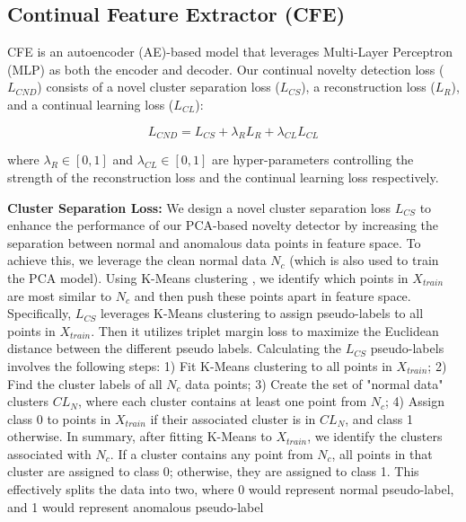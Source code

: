 \subsection{Continual Feature Extractor (CFE)}
CFE is an autoencoder (AE)-based model that leverages Multi-Layer Perceptron (MLP) as both the encoder and decoder. %
Our continual novelty detection loss ($L_{CND}$) consists of a novel cluster separation loss ($L_{CS}$), a reconstruction loss ($L_{R}$), and a continual learning loss ($L_{CL}$): 

\begin{equation}
    \label{equation:final_loss}
    L_{CND} = L_{CS} + \lambda_R L_R + \lambda_{CL} L_{CL}
\end{equation}

where $\lambda_R \in [0,1]$ and $\lambda_{CL} \in [0,1]$ are hyper-parameters controlling the strength of the reconstruction loss and the continual learning loss respectively. 

\textbf{Cluster Separation Loss:} We design a novel cluster separation loss $L_{CS}$ to enhance the performance of our PCA-based novelty detector by increasing the separation between normal and anomalous data points in feature space. To achieve this, we leverage the clean normal data $N_c$ (which is also used to train the PCA model). Using K-Means clustering \cite{kmeans2022}, we identify which points in $X_{train}$ are most similar to $N_c$ and then push these points apart in feature space. 
Specifically, $L_{CS}$ leverages K-Means clustering to assign pseudo-labels to all points in $X_{train}$. Then it utilizes triplet margin loss\cite{schroff2015facenet} to maximize the Euclidean distance between the different pseudo labels. Calculating the $L_{CS}$ pseudo-labels involves the following steps: 1) Fit K-Means clustering to all points in $X_{train}$; 2) Find the cluster labels of all $N_c$ data points; 3) Create the set of "normal data" clusters $CL_N$, where each cluster contains at least one point from $N_c$; 4) Assign class 0 to points in $X_{train}$ if their associated cluster is in $CL_N$, and class 1 otherwise.
In summary, after fitting K-Means to $X_{train}$, we identify the clusters associated with $N_c$. If a cluster contains any point from $N_c$, all points in that cluster are assigned to class 0; otherwise, they are assigned to class 1. This effectively splits the data into two, where 0 would represent normal pseudo-label, and 1 would represent anomalous pseudo-label

